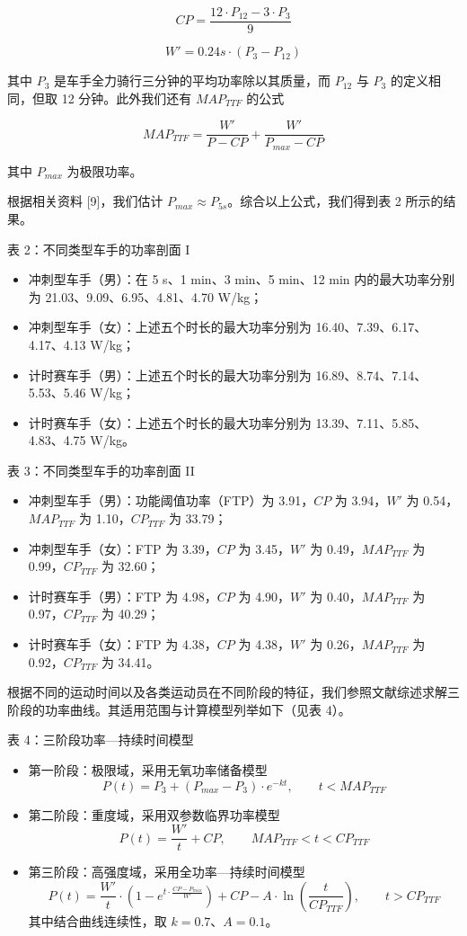 \documentclass[11pt,a4paper]{ctexart}
\begin{document}
\[
CP=\frac{12\cdot P_{12}-3\cdot P_{3}}{9}
\]

\[
W'=0.24s\cdot\left(P_{3}-P_{12}\right)
\]

其中 $P_3$ 是车手全力骑行三分钟的平均功率除以其质量，而 $P_{12}$ 与 $P_3$ 的定义相同，但取 12 分钟。此外我们还有 $MAP_{TTF}$ 的公式

\[
MAP_{TTF}=\frac{W'}{P-CP}+\frac{W'}{P_{max}-CP}
\]

其中 $P_{max}$ 为极限功率。

根据相关资料 [9]，我们估计 $P_{max}\approx P_{5s}$。综合以上公式，我们得到表 2 所示的结果。

表 2：不同类型车手的功率剖面 I

\begin{itemize}
\item 冲刺型车手（男）：在 5 s、1 min、3 min、5 min、12 min 内的最大功率分别为 21.03、9.09、6.95、4.81、4.70 W/kg；
\item 冲刺型车手（女）：上述五个时长的最大功率分别为 16.40、7.39、6.17、4.17、4.13 W/kg；
\item 计时赛车手（男）：上述五个时长的最大功率分别为 16.89、8.74、7.14、5.53、5.46 W/kg；
\item 计时赛车手（女）：上述五个时长的最大功率分别为 13.39、7.11、5.85、4.83、4.75 W/kg。
\end{itemize}

表 3：不同类型车手的功率剖面 II

\begin{itemize}
\item 冲刺型车手（男）：功能阈值功率（FTP）为 3.91，$CP$ 为 3.94，$W'$ 为 0.54，$MAP_{TTF}$ 为 1.10，$CP_{TTF}$ 为 33.79；
\item 冲刺型车手（女）：FTP 为 3.39，$CP$ 为 3.45，$W'$ 为 0.49，$MAP_{TTF}$ 为 0.99，$CP_{TTF}$ 为 32.60；
\item 计时赛车手（男）：FTP 为 4.98，$CP$ 为 4.90，$W'$ 为 0.40，$MAP_{TTF}$ 为 0.97，$CP_{TTF}$ 为 40.29；
\item 计时赛车手（女）：FTP 为 4.38，$CP$ 为 4.38，$W'$ 为 0.26，$MAP_{TTF}$ 为 0.92，$CP_{TTF}$ 为 34.41。
\end{itemize}

根据不同的运动时间以及各类运动员在不同阶段的特征，我们参照文献综述求解三阶段的功率曲线。其适用范围与计算模型列举如下（见表 4）。

表 4：三阶段功率—持续时间模型

\begin{itemize}
\item 第一阶段：极限域，采用无氧功率储备模型
\[
P(t)=P_{3}+\left(P_{max}-P_{3}\right)\cdot e^{-kt},\qquad t<MAP_{TTF}
\]
\item 第二阶段：重度域，采用双参数临界功率模型
\[
P(t)=\frac{W'}{t}+CP,\qquad MAP_{TTF}<t<CP_{TTF}
\]
\item 第三阶段：高强度域，采用全功率—持续时间模型
\[
P(t)=\frac{W'}{t}\cdot\left(1-e^{t\cdot\frac{CP-P_{max}}{W'}}\right)+CP-A\cdot\ln\left(\frac{t}{CP_{TTF}}\right),\qquad t>CP_{TTF}
\]
其中结合曲线连续性，取 $k=0.7$、$A=0.1$。
\end{itemize}
\end{document}
